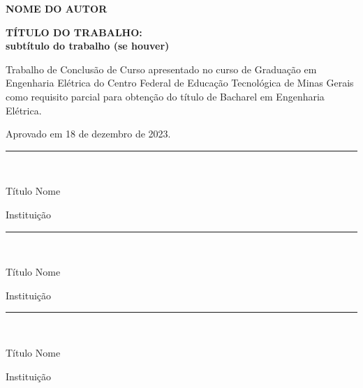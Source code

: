 \thispagestyle{empty}
\begin{titlepage}

\begin{center}

{\large \textbf{NOME DO AUTOR}}

\vspace{5cm}

{\large \textbf{TÍTULO DO TRABALHO: \\ \vspace{0.5 cm} subtítulo do trabalho (se houver)}} \\
\vspace{0.7 cm}
\end{center}

\hspace{6.5cm}\begin{minipage}{8 cm}
     \nohyphens{Trabalho de Conclusão de Curso apresentado no curso de Graduação em Engenharia Elétrica do Centro Federal de Educação Tecnológica de Minas Gerais como requisito parcial para obtenção do título de Bacharel em Engenharia Elétrica.}


\end{minipage}

\vspace{1 cm}

Aprovado em 18 de dezembro de 2023.
\vspace{2 cm}

\begin{center}
\rule{10 cm}{1pt} \\
\vspace{0.3 cm}

Título Nome \\

\vspace{0.2 cm}

Instituição

\vspace{1 cm}

\rule{10 cm}{1pt} \\
\vspace{0.3 cm}

Título Nome \\

\vspace{0.2 cm}

Instituição

\vspace{1 cm}

\rule{10 cm}{1pt} \\
\vspace{0.3 cm}

Título Nome \\

\vspace{0.2 cm}

Instituição

\end{center}
\end{titlepage}